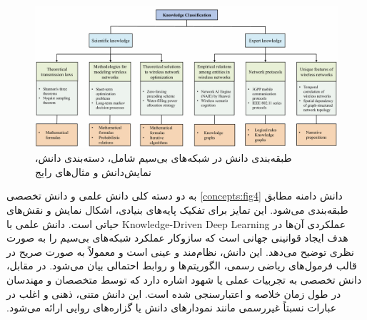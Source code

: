 \begin{figure}
	\centering
	\includegraphics[width=0.9\linewidth]{./Pic/ComprehensiveSurvey_concepts_fig4}
	\caption[ طبقه‌بندی دانش در شبکه‌های بی‌سیم شامل، دسته‌بندی دانش، نمایش‌دانش و مثال‌های رایج]{طبقه‌بندی دانش در شبکه‌های بی‌سیم شامل، دسته‌بندی دانش، نمایش‌دانش و مثال‌های رایج\cite{ComprehensiveSurvey}}
	\label{concepts:fig4}
\end{figure}
‫دانش دامنه مطابق
\autoref{concepts:fig4}
 به دو دسته کلی دانش علمی و دانش تخصصی طبقه‌بندی می‌شود. این تمایز برای تفکیک پایه‌های بنیادی، اشکال نمایش و نقش‌های عملکردی آن‌ها در 
\gls{Knowledge-Driven Deep Learning}
حیاتی است. دانش علمی با هدف ایجاد قوانینی جهانی است که سازوکار عملکرد شبکه‌های بی‌سیم را به صورت نظری توضیح می‌دهد. این دانش، نظام‌مند و عینی است و معمولاً به صورت صریح در قالب فرمول‌های ریاضی رسمی، الگوریتم‌ها و روابط احتمالی بیان می‌شود. در مقابل، دانش تخصصی به تجربیات عملی یا شهود اشاره دارد که توسط متخصصان و مهندسان در طول زمان خلاصه و اعتبارسنجی شده است. این دانش متنی، ذهنی و اغلب در عبارات نسبتاً غیررسمی مانند نمودارهای دانش یا گزاره‌های روایی ارائه می‌شود.‬

